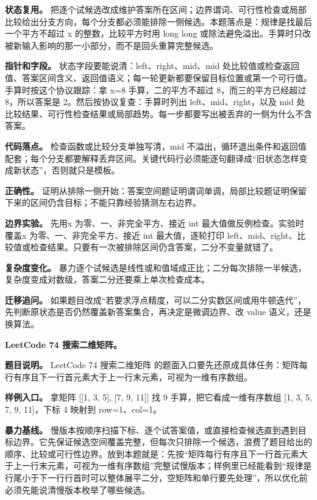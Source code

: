 \textbf{状态复用。} 把逐个试候选改成维护答案所在区间；边界谓词、可行性检查或局部比较给出分支方向，每个分支都必须能排除一侧候选。本题落点是：规律是找最后一个平方不超过 x 的整数，比较平方时用 long long 或除法避免溢出。手算时只改被新输入影响的那一小部分，而不是回头重算完整候选。

\textbf{指针和字段。} 状态字段要能说清：left、right、mid、mid 处比较值或检查返回值、答案区间含义、返回值语义；每一轮更新都要保留目标位置或第一个可行值。手算时按这个协议跟踪：拿 x=8 手算，二的平方不超过 8，而三的平方已经超过 8，所以答案是 2。然后按协议复查：手算时列出 left、mid、right，以及 mid 处比较结果、可行性检查结果或局部趋势。每一步都要写出被丢弃的一侧为什么不含答案。

\textbf{代码落点。} 检查函数或比较分支单独写清，mid 不溢出，循环退出条件和返回值配套；每个分支都要解释丢弃区间。关键代码行必须能逐句翻译成“旧状态怎样变成新状态”，否则就只是模板。

\textbf{正确性。} 证明从排除一侧开始：答案空间题证明谓词单调，局部比较题证明保留下来的区间仍含目标；不能只靠经验猜测左右边界。

\textbf{边界实验。} 先用x 为零、一、非完全平方、接近 int 最大值做反例检查。实验时覆盖x 为零、一、非完全平方、接近 int 最大值，逐轮打印 left、mid、right、比较值或检查结果。只要有一次被排除区间仍含答案，二分不变量就错了。

\textbf{复杂度变化。} 暴力逐个试候选是线性或和值域成正比；二分每次排除一半候选，复杂度变成对数级，答案二分还要乘上单次检查成本。

\textbf{迁移追问。} 如果题目改成“若要求浮点精度，可以二分实数区间或用牛顿迭代”，先判断原状态是否仍然覆盖新答案集合，再决定是微调边界、改 value 语义，还是换算法。

\noindent\textbf{LeetCode 74 搜索二维矩阵。}

\textbf{题目说明。} LeetCode 74 搜索二维矩阵 的题面入口要先还原成具体任务：矩阵每行有序且下一行首元素大于上一行末元素，可视为一维有序数组。

\textbf{样例入口。} 拿矩阵 [[1, 3, 5], [7, 9, 11]] 找 9 手算，把它看成一维有序数组 [1, 3, 5, 7, 9, 11]，下标 4 映射到 row=1、col=1。

\textbf{暴力基线。} 慢版本按顺序扫描下标、逐个试答案值，或直接检查候选直到遇到目标边界。它先保证候选空间覆盖完整，但每次只排除一个候选，浪费了题目给出的顺序、比较或可行性边界。放到本题就是：先按“矩阵每行有序且下一行首元素大于上一行末元素，可视为一维有序数组”完整试慢版本；样例里已经能看到“规律是行尾小于下一行行首时可以整体展平二分，空矩阵和单行要先处理”，所以优化前必须先能说清慢版本枚举了哪些候选。

